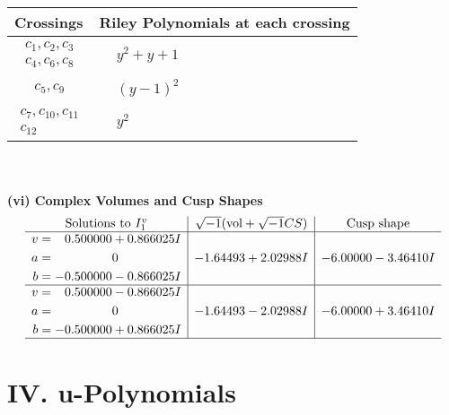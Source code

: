 \documentclass[1p]{elsarticle_modified}
\theoremstyle{definition}
\newcommand{\I}{\sqrt{-1}}
\begin{document}
\begin{tabular}{m{50pt}|m{274pt}}
Crossings & \hspace{64pt}Riley Polynomials at each crossing \\
\hline $$\begin{aligned}c_{1},c_{2},c_{3}\\c_{4},c_{6},c_{8}\end{aligned}$$&$\begin{aligned}
&y^2+y+1
\end{aligned}$\\
\hline $$\begin{aligned}c_{5},c_{9}\end{aligned}$$&$\begin{aligned}
&(y-1)^2
\end{aligned}$\\
\hline $$\begin{aligned}c_{7},c_{10},c_{11}\\c_{12}\end{aligned}$$&$\begin{aligned}
&y^2
\end{aligned}$\\
\hline
\end{tabular}\\~\\
\newpage\flushleft \textbf{(vi) Complex Volumes and Cusp Shapes}
$$\begin{array}{c|c|c}  
\text{Solutions to }I^v_{1}& \I (\text{vol} + \sqrt{-1}CS) & \text{Cusp shape}\\
 \hline 
\begin{aligned}
v &= \phantom{-}0.500000 + 0.866025 I \\
a &= \phantom{-0.000000 } 0 \\
b &= -0.500000 - 0.866025 I\end{aligned}
 & -1.64493 + 2.02988 I & -6.00000 - 3.46410 I \\ \hline\begin{aligned}
v &= \phantom{-}0.500000 - 0.866025 I \\
a &= \phantom{-0.000000 } 0 \\
b &= -0.500000 + 0.866025 I\end{aligned}
 & -1.64493 - 2.02988 I & -6.00000 + 3.46410 I\\
 \hline 
 \end{array}$$\newpage
\newpage\renewcommand{\arraystretch}{1}
\centering \section*{ IV. u-Polynomials}
\end{document}
